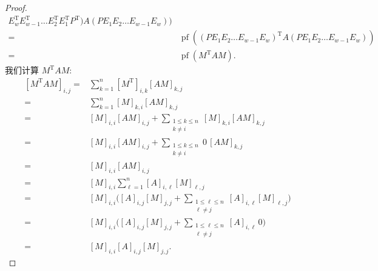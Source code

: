 \begin{proof}
\begin{align*}
{        E_w^{\mathrm{T}}
        E_{w-1}^{\mathrm{T}}
        \dots
        E_2^{\mathrm{T}}
        E_1^{\mathrm{T}}
        P^{\mathrm{T}}
        )
        A
        (
        P
        E_1
        E_2
        \dots
        E_{w-1}
        E_w
        )
        )}
        \\
        = {} &
        \operatorname{pf}
        {(
            (P E_1 E_2 \dots E_{w-1} E_w)^{\mathrm{T}}
            A
            (P E_1 E_2 \dots E_{w-1} E_w)
            )}
        \\
        = {} &
        \operatorname{pf}
        {(
            M^{\mathrm{T}} A M
            )}.
    \end{align*}
    我们计算 \(M^{\mathrm{T}} A M\):
    \begin{align*}
        [M^{\mathrm{T}} A M]_{i,j}
        = {} &
        \sum_{k = 1}^{n}
        {
        [M^{\mathrm{T}}]_{i,k} [A M]_{k,j}
        }
        \\
        = {} &
        \sum_{k = 1}^{n}
        {
        [M]_{k,i} [A M]_{k,j}
        }
        \\
        = {} &
        [M]_{i,i} [A M]_{i,j}
        +
        \sum_{\substack{1 \leq k \leq n    \\k \neq i}}
        {
            [M]_{k,i} [A M]_{k,j}
        }
        \\
        = {} &
        [M]_{i,i} [A M]_{i,j}
        +
        \sum_{\substack{1 \leq k \leq n    \\k \neq i}}
        {
            0\, [A M]_{k,j}
        }
        \\
        = {} &
        [M]_{i,i}
            [A M]_{i,j}
        \\
        = {} &
        [M]_{i,i}
        \sum_{\ell = 1}^{n}
        {[A]_{i,\ell} [M]_{\ell,j}}
        \\
        = {} &
        [M]_{i,i}
        \Bigg(
        [A]_{i,j} [M]_{j,j}
        +
        \sum_{\substack{1 \leq \ell \leq n \\ \ell \neq j}}
        {[A]_{i,\ell} [M]_{\ell,j}}
        \Bigg)
        \\
        = {} &
        [M]_{i,i}
        \Bigg(
        [A]_{i,j} [M]_{j,j}
        +
        \sum_{\substack{1 \leq \ell \leq n \\ \ell \neq j}}
        {[A]_{i,\ell} \, 0}
        \Bigg)
        \\
        = {} &
        [M]_{i,i}
            [A]_{i,j}
            [M]_{j,j}.

\end{align*}
\end{proof}
